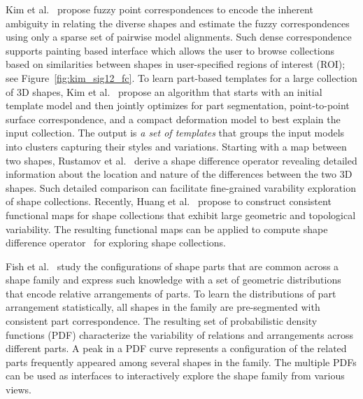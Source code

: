 Kim et al.~\cite{Kim:2012:FC} propose fuzzy point correspondences to encode the inherent ambiguity
in relating the diverse shapes and estimate the fuzzy correspondences using only a sparse set of pairwise model alignments.
Such dense correspondence supports painting based interface which allows the user
to browse collections based on similarities between shapes in user-specified regions of interest (ROI); see Figure~\ref{fig:kim_sig12_fc}.
%
To learn part-based templates for a large collection of 3D shapes, Kim et al.~\cite{Kim:2013:LPT} propose an algorithm that starts
with an initial template model and then jointly optimizes for part segmentation, point-to-point surface correspondence, and a compact
deformation model to best explain the input collection.
The output is \emph{a set of templates} that groups the input models into clusters capturing their styles and variations.
%
Starting with a map between two shapes, Rustamov et al.~\cite{Rustamov:2013:SD} derive a shape difference operator
revealing detailed information about the location and nature of the differences between the two 3D shapes.
Such detailed comparison can facilitate fine-grained varability exploration of shape collections.
%
Recently, Huang et al.~\cite{Huang:2014:FMN} propose to construct consistent functional maps for shape collections
that exhibit large geometric and topological variability.
The resulting functional maps can be applied to compute shape difference operator~\cite{Rustamov:2013:SD} for
exploring shape collections.

Fish et al.~\cite{Fish:2014:MR} study the configurations of shape parts that are common across a shape family
and express such knowledge with a set of geometric distributions that encode relative arrangements of parts.
To learn the distributions of part arrangement statistically, all shapes in the family are pre-segmented with consistent part correspondence.
The resulting set of probabilistic density functions (PDF) characterize the variability of relations and arrangements
across different parts. A peak in a PDF curve represents a configuration of the related parts
frequently appeared among several shapes in the family.
The multiple PDFs can be used as interfaces to interactively explore the shape family from various views.




